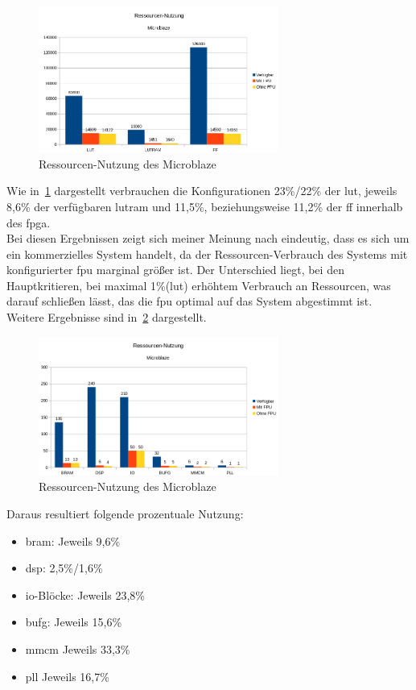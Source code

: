 \begin{figure}[H]
\centering
\includegraphics[width=0.7\textwidth]{Hauptteil/ressourcenmb1.png}
\caption{Ressourcen-Nutzung des Microblaze}
\label{fig:ressourcenmb1}
\end{figure}

Wie in~\ref{fig:ressourcenmb1} dargestellt verbrauchen die Konfigurationen 23\%/22\% der \ac{lut}, jeweils 8,6\% der verfügbaren \ac{lutram} und 11,5\%, beziehungsweise 11,2\% der \ac{ff}
innerhalb des \ac{fpga}.\\
Bei diesen Ergebnissen zeigt sich meiner Meinung nach eindeutig, dass es sich um ein kommerzielles System handelt, da der Ressourcen-Verbrauch des Systems mit konfigurierter \ac{fpu}
marginal größer ist. Der Unterschied liegt, bei den Hauptkritieren, bei maximal 1\%(\ac{lut}) erhöhtem Verbrauch an Ressourcen, was darauf schließen lässt, das die \ac{fpu} optimal auf das System
abgestimmt ist.\\

Weitere Ergebnisse sind in~\ref{fig:ressourcenmb2} dargestellt.\\

\begin{figure}[H]
\centering
\includegraphics[width=0.7\textwidth]{Hauptteil/ressourcenmb2.png}
\caption{Ressourcen-Nutzung des Microblaze}
\label{fig:ressourcenmb2}
\end{figure}

Daraus resultiert folgende prozentuale Nutzung:\\
\begin{itemize}
  \item \ac{bram}: Jeweils 9,6\%
  \item \ac{dsp}: 2,5\%/1,6\%
  \item \ac{io}-Blöcke: Jeweils 23,8\%
  \item \ac{bufg}: Jeweils 15,6\%
  \item \ac{mmcm} Jeweils 33,3\%
  \item \ac{pll} Jeweils 16,7\%
\end{itemize}

